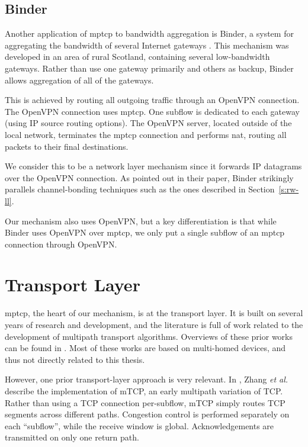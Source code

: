 \documentclass{cwru}
\begin{document}
\subsection{Binder}

Another application of \ac{mptcp} to bandwidth aggregation is Binder, a system
for aggregating the bandwidth of several Internet gateways \cite{binder}. This
mechanism was developed in an area of rural Scotland, containing several
low-bandwidth gateways. Rather than use one gateway primarily and others as
backup, Binder allows aggregation of all of the gateways.

This is achieved by routing all outgoing traffic through an OpenVPN connection.
The OpenVPN connection uses \ac{mptcp}. One subflow is dedicated to each gateway
(using IP source routing options). The OpenVPN server, located outside of the
local network, terminates the \ac{mptcp} connection and performs \ac{nat},
routing all packets to their final destinations.

We consider this to be a network layer mechanism since it forwards IP datagrams
over the OpenVPN connection. As pointed out in their paper, Binder strikingly
parallels channel-bonding techniques such as the ones described in
Section~\ref{s:rw-ll}.

Our mechanism also uses OpenVPN, but a key differentiation is that while Binder
uses OpenVPN over \ac{mptcp}, we only put a single subflow of an \ac{mptcp}
connection through OpenVPN.

\section{Transport Layer}
\label{s:rw-transport}

\ac{mptcp}, the heart of our mechanism, is at the transport layer. It is built
on several years of research and development, and the literature is full of work
related to the development of multipath transport algorithms. Overviews of these
prior works can be found in \cite{barre2011multipath,raiciu2012hard}. Most of
these works are based on multi-homed devices, and thus not directly related to
this thesis.

However, one prior transport-layer approach is very relevant. In
\cite{zhang2004transport}, Zhang \textit{et al.} describe the implementation of
mTCP, an early multipath variation of TCP. Rather than using a TCP connection
per-subflow, mTCP simply routes TCP segments across different paths. Congestion
control is performed separately on each ``subflow'', while the receive window is
global. Acknowledgements are transmitted on only one return path.
\end{document}
